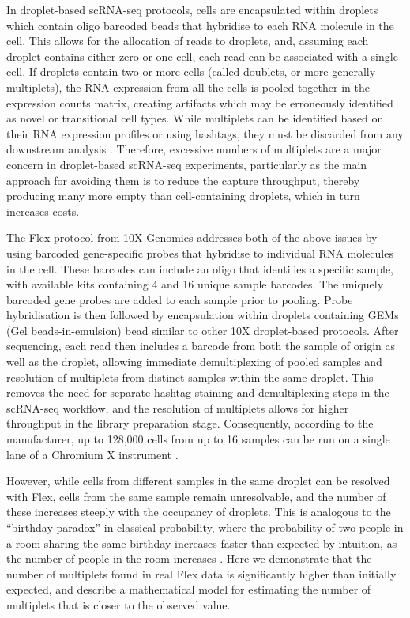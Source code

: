 \documentclass[unnumsec,webpdf,modern,large]{oup-authoring-template}
\begin{document}
	In droplet-based scRNA-seq protocols, cells are encapsulated within droplets which contain oligo barcoded beads that hybridise to each RNA molecule in the cell. 
	This allows for the allocation of reads to droplets, and, assuming each droplet contains either zero or one cell, each read can be associated with a single cell. 
	If droplets contain two or more cells (called doublets, or more generally multiplets), the RNA expression from all the cells is pooled together in the expression counts matrix, creating artifacts which may be erroneously identified as novel or transitional cell types. 
	While multiplets can be identified based on their  RNA expression profiles or using hashtags, they must be discarded from any downstream analysis
	\citep{Neavin2024}.
	Therefore, excessive numbers of multiplets are a major concern in droplet-based scRNA-seq experiments, particularly as the main approach for  avoiding them is to reduce the capture throughput, thereby producing many more empty than cell-containing droplets, which in turn increases costs.
	
	The Flex protocol from 10X Genomics addresses both of the above issues by using barcoded gene-specific probes that hybridise to individual RNA molecules in the cell. 
	These barcodes can include an oligo that identifies a specific sample, with available kits containing 4 and 16 unique sample barcodes. 
	The uniquely barcoded gene probes are added to each sample prior to pooling. 
	Probe hybridisation is then followed by encapsulation within droplets containing GEMs (Gel beads-in-emulsion) bead similar to other 10X droplet-based protocols. 
	After sequencing, each read then includes a barcode from both the sample of origin as well as the droplet, allowing immediate demultiplexing of pooled samples and resolution of multiplets from distinct samples within the same droplet. 
	This removes the need for separate hashtag-staining and demultiplexing steps in the scRNA-seq workflow, and the resolution of multiplets allows for higher throughput in the library preparation stage. 
	Consequently, according to the manufacturer, up to 128,000 cells from up to 16 samples can be run on a single lane of a Chromium X instrument 
	\citep{10X_flex_protocol}. 
	
	However, while cells from different samples in the same droplet can be resolved with Flex, cells from the same sample remain unresolvable, and the number of these increases steeply with the occupancy of droplets. 
	This is analogous to the ``birthday paradox” in classical probability, where the probability of two people in a room sharing the same birthday increases faster than expected by intuition, as the number of people in the room increases
	\citep{Mulqueen2021}.
	Here we demonstrate that the number of multiplets found in real Flex data is significantly higher than initially expected, and describe a mathematical model for estimating the number of multiplets that is closer to the observed value. 
\end{document}
